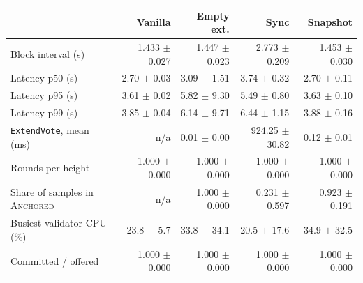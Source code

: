 \begin{tabular}{@{}lrrrr@{}}
\toprule
 & \textbf{Vanilla} & \textbf{Empty ext.} & \textbf{Sync} & \textbf{Snapshot} \\
\midrule
Block interval (s) & 1.433 $\pm$ 0.027 & 1.447 $\pm$ 0.023 & 2.773 $\pm$ 0.209 & 1.453 $\pm$ 0.030 \\
Latency p50 (s) & 2.70 $\pm$ 0.03 & 3.09 $\pm$ 1.51 & 3.74 $\pm$ 0.32 & 2.70 $\pm$ 0.11 \\
Latency p95 (s) & 3.61 $\pm$ 0.02 & 5.82 $\pm$ 9.30 & 5.49 $\pm$ 0.80 & 3.63 $\pm$ 0.10 \\
Latency p99 (s) & 3.85 $\pm$ 0.04 & 6.14 $\pm$ 9.71 & 6.44 $\pm$ 1.15 & 3.88 $\pm$ 0.16 \\
\texttt{ExtendVote}, mean (ms) & n/a & 0.01 $\pm$ 0.00 & 924.25 $\pm$ 30.82 & 0.12 $\pm$ 0.01 \\
Rounds per height & 1.000 $\pm$ 0.000 & 1.000 $\pm$ 0.000 & 1.000 $\pm$ 0.000 & 1.000 $\pm$ 0.000 \\
Share of samples in \textsc{Anchored} & n/a & 1.000 $\pm$ 0.000 & 0.231 $\pm$ 0.597 & 0.923 $\pm$ 0.191 \\
Busiest validator CPU (\%) & 23.8 $\pm$ 5.7 & 33.8 $\pm$ 34.1 & 20.5 $\pm$ 17.6 & 34.9 $\pm$ 32.5 \\
Committed / offered & 1.000 $\pm$ 0.000 & 1.000 $\pm$ 0.000 & 1.000 $\pm$ 0.000 & 1.000 $\pm$ 0.000 \\
\bottomrule
\end{tabular}
